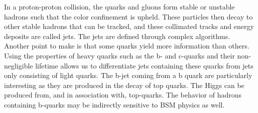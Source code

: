 In a proton-proton collision, the quarks and gluons form stable or unstable hadrons such 
that the color confinement is upheld\cite{Hwang_Wu_2018}. These particles then decay to other stable 
hadrons that can be tracked, and these collimated tracks and energy deposits are called jets. The jets are defined through
complex algorithms. Another point to make is that some quarks yield more 
information than others. Using the properties of heavy quarks such as the b- and c-quarks and 
their non-negligible lifetime allows us to differentiate jets containing these quarks from 
jets only consisting of light quarks. The b-jet coming from a b quark are particularly interesting 
as they are produced in the decay of top quarks. The Higgs can be produced from, 
and in association with, top-quarks. The behavior of hadrons containing b-quarks may be 
indirectly sensitive to BSM physics as well. 